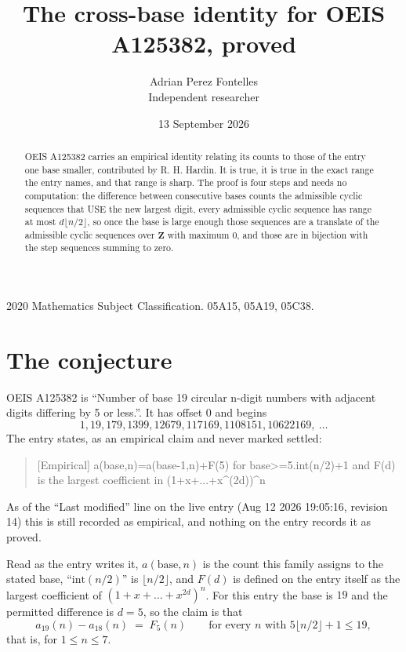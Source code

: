 \documentclass[11pt,a4paper]{article}
\title{The cross-base identity for OEIS A125382, proved}
\author{Adrian Perez Fontelles\\ \small Independent researcher}
\date{13 September 2026}
\theoremstyle{plain}
\theoremstyle{definition}
\begin{document}
\maketitle

\begin{abstract}
OEIS A125382 carries an empirical identity relating its counts to those of the entry one base
smaller, contributed by R. H. Hardin. It is true, it is true in the exact range the entry
names, and that range is sharp. The proof is four steps and needs no computation: the
difference between consecutive bases counts the admissible cyclic sequences that USE the new
largest digit, every admissible cyclic sequence has range at most $d\lfloor n/2\rfloor$, so
once the base is large enough those sequences are a translate of the admissible cyclic
sequences over $\mathbf{Z}$ with maximum $0$, and those are in bijection with the step
sequences summing to zero.
\end{abstract}

\noindent\small 2020 Mathematics Subject Classification. 05A15, 05A19, 05C38.\normalsize

\section{The conjecture}

OEIS A125382 is ``Number of base 19 circular n-digit numbers with adjacent digits differing by 5 or less.''. It has offset $0$ and begins
\[
1, 19, 179, 1399, 12679, 117169, 1108151, 10622169,\ \dots
\]
The entry states, as an empirical claim and never marked settled:
\begin{quote}
[Empirical] a(base,n)=a(base-1,n)+F(5) for base>=5.int(n/2)+1 and F(d) is the largest coefficient in (1+x+...+x\textasciicircum{}(2d))\textasciicircum{}n
\end{quote}
As of the ``Last modified'' line on the live entry (Aug 12 2026 19:05:16, revision 14)
this is still recorded as empirical, and nothing on the entry records it as proved.

Read as the entry writes it, $a(\mathrm{base},n)$ is the count this family assigns to the
stated base, ``$\mathrm{int}(n/2)$'' is $\lfloor n/2\rfloor$, and $F(d)$ is defined on the
entry itself as the largest coefficient of $(1+x+\dots+x^{2d})^{n}$. For this entry
the base is $19$ and the permitted difference is $d=5$, so the claim is that
\[
a_{19}(n)-a_{18}(n)\;=\;F_{5}(n)
\qquad\text{for every } n \text{ with } 5\lfloor n/2\rfloor+1\le19,
\]
that is, for $1\le n\le7$.
\end{document}
